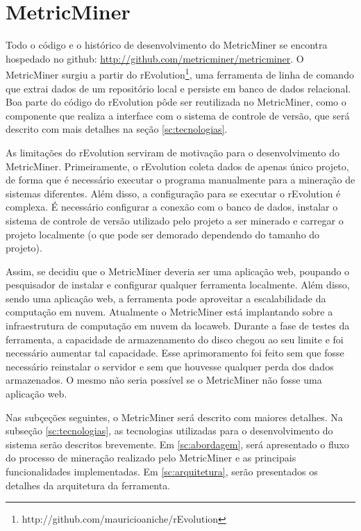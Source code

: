 \documentclass[a4paper, 12pt, twoside]{book}
\begin{document}
\chapter{MetricMiner} \label{ch:arquitetura}

    Todo o código e o histórico de desenvolvimento do MetricMiner se encontra hospedado no github: \url{http://github.com/metricminer/metricminer}. O MetricMiner surgiu a partir do rEvolution\footnote{http://github.com/mauricioaniche/rEvolution}, uma ferramenta de linha de comando que extrai dados de um repositório local e persiste em banco de dados  relacional. Boa parte do código do rEvolution pôde ser reutilizada no MetricMiner, como o componente que realiza a interface com o sistema de controle de versão, que será descrito com mais detalhes na seção \ref{sc:tecnologias}.

    As limitações do rEvolution serviram de motivação para o desenvolvimento do MetricMiner. Primeiramente, o rEvolution coleta dados de apenas único projeto, de forma que é necessário executar o programa manualmente para a mineração de sistemas diferentes. Além disso, a configuração para se executar o rEvolution é complexa. É necessário configurar a conexão com o banco de dados, instalar o sistema de controle de versão utilizado pelo projeto a ser minerado e carregar o projeto localmente (o que pode ser demorado dependendo do tamanho do projeto). 

    Assim, se decidiu que o MetricMiner deveria ser uma aplicação web, poupando o pesquisador de instalar e configurar qualquer ferramenta localmente. Além disso, sendo uma aplicação web, a ferramenta pode aproveitar a escalabilidade da computação em nuvem. Atualmente o MetricMiner está implantando sobre a infraestrutura de computação em nuvem da locaweb. Durante a fase de testes da ferramenta, a capacidade de armazenamento do disco chegou ao seu limite e foi necessário aumentar tal capacidade. Esse aprimoramento foi feito sem que fosse necessário reinstalar o servidor e sem que houvesse qualquer perda dos dados armazenados. O mesmo não seria possível se o MetricMiner não fosse uma aplicação web.

    Nas subçeções seguintes, o MetricMiner será descrito com maiores detalhes. Na subseção \ref{sc:tecnologias}, as tecnologias utilizadas para o desenvolvimento do sistema serão descritos brevemente. Em \ref{sc:abordagem}, será apresentado o fluxo do processo de mineração realizado pelo MetricMiner e as principais funcionalidades implementadas. Em \ref{sc:arquitetura}, serão presentados os detalhes da arquitetura da ferramenta.
\end{document}
